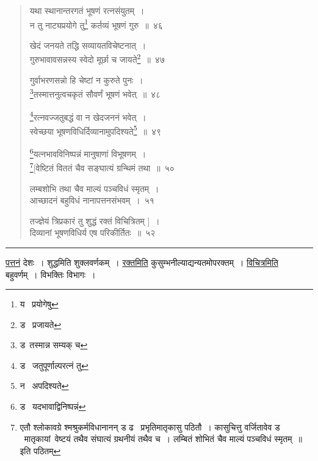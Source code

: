 \documentclass[11pt, openany]{book}
\begin{document}
\newpage

\begin{quote}
{\na यथा स्थानान्तरगतं भूषणं रत्नसंयुतम्~।\\
न तु नाट्यप्रयोगे तु\renewcommand{\thefootnote}{1}\footnote{य \textendash\ प्रयोगेषु} कर्तव्यं भूषणं गुरु~॥~४६

खेदं जनयते तद्धि सव्यायतविचेष्टनात्~।\\
गुरुभावावसन्नस्य स्वेदो मूर्छा च जायते\renewcommand{\thefootnote}{2}\footnote{ड \textendash\ प्रजायते}~॥~४७

गुर्वाभरणसन्नो हि चेष्टां न कुरुते पुनः~।\\
\renewcommand{\thefootnote}{3}\footnote{ड\textendash\ तस्मान्न सम्यक् च}तस्मात्तनुत्वचकृतं सौवर्णं भूषणं भवेत्~॥~४८

\renewcommand{\thefootnote}{4}\footnote{ड \textendash\ जतुपूर्णाल्परत्नं तु}रत्नवज्जतुबद्धं वा न खेदजननं भवेत्~।\\
स्वेच्छया भूषणविधिर्दिव्यानामुपदिश्यते\renewcommand{\thefootnote}{5}\footnote{न \textendash\ अपदिश्यते}~॥~४९

\renewcommand{\thefootnote}{6}\footnote{ड \textendash\ यदभावाद्विनिष्पन्नं}यत्नभावविनिष्पन्नं मानुषाणां विभूषणम्~।\\
\renewcommand{\thefootnote}{*}\footnote{एतौ श्लोकावग्रे श्मश्रुकर्मविधानानन् ड ढ \textendash\ प्रभृतिमातृकासु पठितौ~। कासुचित्तु वर्जितावेव ड \textendash\ मातृकायां\textendash\ वेष्टयं तथैव संघात्यं ग्रथनीयं तथैव च~। लम्बितं शोभितं चैव माल्यं पञ्चविधं स्मृतम्~॥ इति पठितम्}[वेष्टितं विततं चैव सङ्घात्यं ग्रन्थिमं तथा~॥~५०

लम्बशोभि तथा चैव माल्यं पञ्चविधं स्मृतम्~।\\
आच्छादनं बहुविधं नानापत्तनसंभवम्~।~५१

तज्ज्ञेयं त्रिप्रकारं तु शुद्धं रक्तं विचित्रितम् ]~।\\
दिव्यानां भूषणविधिर्य एष परिकीर्तितः~॥~५२}
\end{quote}

\hrule

\vspace{2mm}
\underline{पत्तनं} देशः~। शुद्धमिति शुक्लवर्णकम्~। \underline{रक्तमिति} कुसुम्भनील्याद्यन्यतमोपरक्तम्~। \underline{विचित्रमिति} बहुवर्णम्~। विभक्तिः विभागः~।

\newpage
\end{document}
